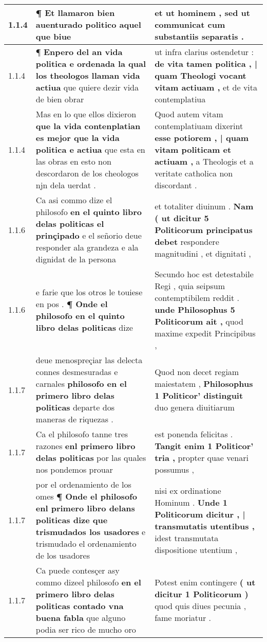 \begin{tabular}{|p{1cm}|p{6.5cm}|p{6.5cm}|}
1.1.4 & ¶ \textbf{ Et llamaron bien auenturado politico } aquel que biue & et ut hominem , \textbf{ sed ut communicat } cum substantiis separatis . \\\hline
1.1.4 & ¶ \textbf{ Enpero del an vida politica e ordenada la qual los theologos llaman vida actiua } que quiere dezir vida de bien obrar & ut infra clarius ostendetur : \textbf{ de vita tamen politica , | quam Theologi vocant vitam actiuam , } et de vita contemplatiua \\\hline
1.1.4 & Mas en lo que ellos dixieron \textbf{ que la vida contenplatian es mejor que la vida politica e actiua } que esta en las obras en esto non descordaron de los cheologos njn dela uerdat . & Quod autem vitam contemplatiuam dixerint \textbf{ esse potiorem , | quam vitam politicam et actiuam , } a Theologis et a veritate catholica non discordant . \\\hline
1.1.6 & Ca asi commo dize el philosofo \textbf{ en el quinto libro delas politicas el prinçipado } e el señorio deue responder ala grandeza e ala dignidat de la persona & et totaliter diuinum . \textbf{ Nam ( ut dicitur 5 Politicorum principatus debet } respondere magnitudini , et dignitati , \\\hline
1.1.6 & e farie que los otros le touiese en pos . \textbf{ ¶ Onde el philosofo en el quinto libro delas politicas } dize & Secundo hoc est detestabile Regi , quia seipsum contemptibilem reddit . \textbf{ unde Philosophus 5 Politicorum ait , } quod maxime expedit Principibus , \\\hline
1.1.7 & deue menospreçiar las delecta connes desmesuradas e carnales \textbf{ philosofo en el primero libro delas politicas } departe dos maneras de riquezas . & Quod non decet regiam maiestatem , \textbf{ Philosophus 1 Politicor’ distinguit } duo genera diuitiarum \\\hline
1.1.7 & Ca el philosofo tanne tres razones \textbf{ enl primero libro delas politicas } por las quales nos pondemos prouar & est ponenda felicitas . \textbf{ Tangit enim 1 Politicor’ tria , } propter quae venari possumus , \\\hline
1.1.7 & por el ordenamiento de los omes \textbf{ ¶ Onde el philosofo enl primero libro delans politicas dize que trismudados los usadores } e trismudado el ordenamiento de los usadores & nisi ex ordinatione Hominum . \textbf{ Unde 1 Politicorum dicitur , | transmutatis utentibus , } idest transmutata dispositione utentium , \\\hline
1.1.7 & Ca puede contesçer asy commo dizeel philosofo \textbf{ en el primero libro delas politicas contado vna buena fabla } que alguno podia ser rico de mucho oro & Potest enim contingere \textbf{ ( ut dicitur 1 Politicorum ) } quod quis diues pecunia , fame moriatur . \\\hline

\end{tabular}
